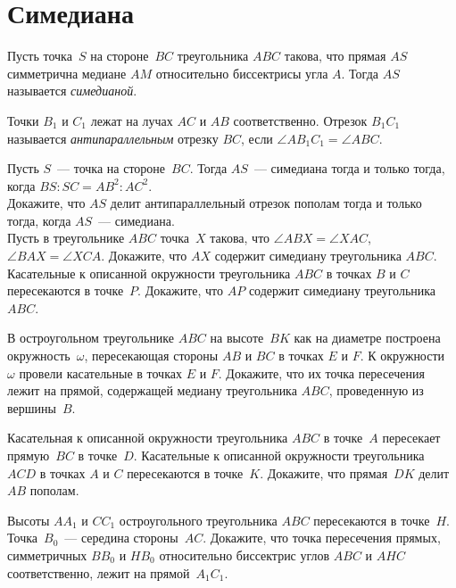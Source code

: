 
\section*{Симедиана}


Пусть точка~$S$ на стороне~$BC$ треугольника $ABC$ такова, что прямая $AS$
симметрична медиане $AM$ относительно биссектрисы угла $A$.
Тогда $AS$ называется \emph{симедианой}.

Точки $B_1$ и $C_1$ лежат на лучах $AC$ и $AB$ соответственно.
Отрезок $B_1 C_1$ называется \emph{антипараллельным} отрезку $BC$, если
$\angle A B_1 C_1 = \angle ABC$.

\begin{problems}

\item
\subproblem
Пусть $S$~--- точка на стороне~$BC$.
Тогда $AS$~--- симедиана тогда и только тогда, когда $BS : SC = AB^2 : AC^2$.
\\
\subproblem
Докажите, что $AS$ делит антипараллельный отрезок пополам тогда и только тогда,
когда $AS$~--- симедиана.
\\
\subproblem
Пусть в треугольнике $ABC$ точка~$X$ такова, что $\angle ABX = \angle XAC$,
$\angle BAX = \angle XCA$.
Докажите, что $AX$ содержит симедиану треугольника $ABC$.
\\
\subproblem
Касательные к описанной окружности треугольника $ABC$ в точках $B$ и $C$
пересекаются в точке~$P$.
Докажите, что $AP$ содержит симедиану треугольника $ABC$.

\item
В остроугольном треугольнике $ABC$ на высоте~$BK$ как на диаметре построена
окружность~$\omega$, пересекающая стороны $AB$ и $BC$ в точках $E$ и $F$.
К окружности~$\omega$ провели касательные в точках $E$ и $F$.
Докажите, что их точка пересечения лежит на прямой, содержащей медиану
треугольника $ABC$, проведенную из вершины~$B$.

\item
Касательная к описанной окружности треугольника $ABC$ в точке~$A$ пересекает
прямую~$BC$ в точке~$D$.
Касательные к описанной окружности треугольника $ACD$ в точках $A$ и $C$
пересекаются в точке~$K$.
Докажите, что прямая~$DK$ делит $AB$ пополам.

\item
Высоты $A A_1$ и $C C_1$ остроугольного треугольника $ABC$ пересекаются
в точке~$H$.
Точка~$B_0$~--- середина стороны~$AC$.
Докажите, что точка пересечения прямых, симметричных $B B_0$ и $H B_0$
относительно биссектрис углов $ABC$ и $AHC$ соответственно, лежит
на прямой~$A_1 C_1$.


\end{problems}
